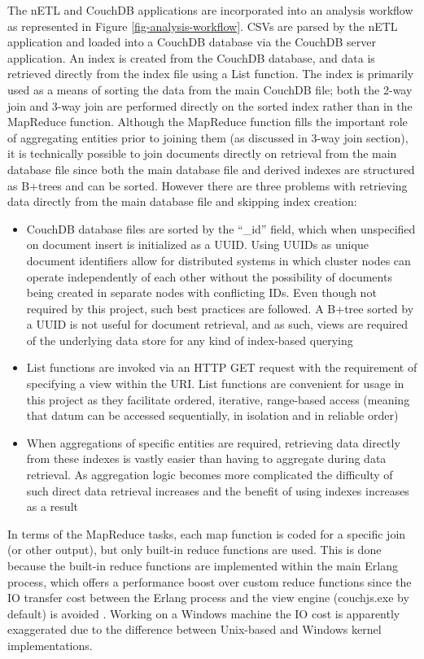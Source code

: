 The nETL and CouchDB applications are incorporated into an analysis workflow as represented in Figure \ref{fig-analysis-workflow}. CSVs are parsed by the nETL application and loaded into a CouchDB database via the CouchDB server application. An index is created from the CouchDB database, and data is retrieved directly from the index file using a List function. The index is primarily used as a means of sorting the data from the main CouchDB file; both the 2-way join and 3-way join are performed directly on the sorted index rather than in the MapReduce function. Although the MapReduce function fills the important role of aggregating entities prior to joining them (as discussed in 3-way join section), it is technically possible to join documents directly on retrieval from the main database file since both the main database file and derived indexes are structured as B+trees and can be sorted. However there are three problems with retrieving data directly from the main database file and skipping index creation:

\begin{itemize}
    \item CouchDB database files are sorted by the ``\_id'' field, which when unspecified on document insert is initialized as a UUID. Using UUIDs as unique document identifiers allow for distributed systems in which cluster nodes can operate independently of each other without the possibility of documents being created in separate nodes with conflicting IDs. Even though not required by this project, such best practices are followed. A B+tree sorted by a UUID is not useful for document retrieval, and as such, views are required of the underlying data store for any kind of index-based querying
    \item List functions are invoked via an HTTP GET request with the requirement of specifying a view within the URI. List functions are convenient for usage in this project as they facilitate ordered, iterative, range-based access (meaning that datum can be accessed sequentially, in isolation and in reliable order)
    \item When aggregations of specific entities are required, retrieving data directly from these indexes is vastly easier than having to aggregate during data retrieval. As aggregation logic becomes more complicated the difficulty of such direct data retrieval increases and the benefit of using indexes increases as a result
\end{itemize}

In terms of the MapReduce tasks, each map function is coded for a specific join (or other output), but only built-in reduce functions are used. This is done because the built-in reduce functions are implemented within the main Erlang process, which offers a performance boost over custom reduce functions since the IO transfer cost between the Erlang process and the view engine (couchjs.exe by default) is avoided \cite{slack1Nov}. Working on a Windows machine the IO cost is apparently exaggerated due to the difference between Unix-based and Windows kernel implementations.


